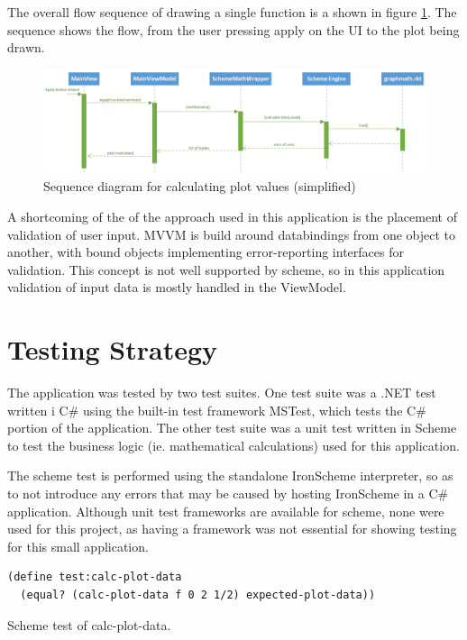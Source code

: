 \documentclass[a4paper,12pt]{article}
\newcommand{\code}[1]{{\fontfamily{pcr}\selectfont #1}}
\begin{document}
The overall flow sequence of drawing a single function is a shown in figure \ref{fig:sequence}. The sequence shows the flow, from the user pressing apply on the UI to the plot being drawn.

\begin{figure}[h]
	\centering
	\includegraphics[scale=0.45]{sequence}
	\caption{Sequence diagram for calculating plot values (simplified)}
    \label{fig:sequence}
\end{figure} 

A shortcoming of the of the approach used in this application is the placement of validation of user input. MVVM is build around databindings from one object to another, with bound objects implementing error-reporting interfaces for validation. This concept is not well supported by scheme, so in this application validation of input data is mostly handled in the ViewModel.
		
\section{Testing Strategy}	
The application was tested by two test suites. One test suite was a .NET test written i C\# using the built-in test framework MSTest, which tests the C\# portion of the application. The other test suite was a unit test written in Scheme to test the business logic (ie. mathematical calculations) used for this application. 

The scheme test is performed using the standalone IronScheme interpreter, so as to not introduce any errors that may be caused by hosting IronScheme in a C\# application. 
Although unit test frameworks are available for scheme, none were used for this project, as having a framework was not essential for showing testing for this small application.

\begin{listing}[H]
\begin{verbatim}
(define test:calc-plot-data 
  (equal? (calc-plot-data f 0 2 1/2) expected-plot-data))
\end{verbatim}	

\caption{Scheme test of \code{calc-plot-data}.}
\label{lst:SchemeTest}
\end{listing}
\end{document}
